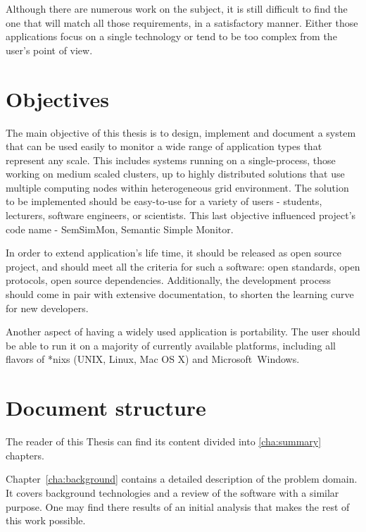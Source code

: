 Although there are numerous work on the subject, it is still difficult to find the one that will match all those requirements, in a satisfactory manner. Either those applications focus on a single technology or tend to be too complex from the user\rq{}s point of view.


\section{Objectives}
\label{ch1:Objectives}

The main objective of this thesis is to design, implement and document a system that can be used easily to monitor a wide range of application types that represent any scale. This includes systems running on a single-process, those working on medium scaled clusters, up to highly distributed solutions that use multiple computing nodes within heterogeneous grid environment. The solution to be implemented should be easy-to-use for a variety of users - students, lecturers, software engineers, or scientists. This last objective influenced project's code name - SemSimMon, Semantic Simple Monitor.

In order to extend application's life time, it should be released as open source project, and should meet all the criteria for such a software: open standards, open protocols, open source dependencies. Additionally, the development process should come in pair with extensive documentation, to shorten the learning curve for new developers.

Another aspect of having a widely used application is portability. The user should be able to run it on a majority of currently available platforms, including all flavors of *nixs (UNIX, Linux, Mac OS X\textregistered) and Microsoft\textregistered~Windows\textregistered. 

\section{Document structure}
\label{ch1:docStructure}

The reader of this Thesis can find its content divided into \ref{cha:summary} chapters.

Chapter~\ref{cha:background} contains a detailed description of the problem domain. It covers background technologies and a review of the software with a similar purpose. One may find there results of an initial analysis that makes the rest of this work possible.

